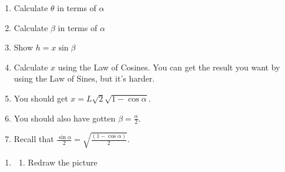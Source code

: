 \documentclass[english]{book}
\begin{document}
    \begin{enumerate}
      \item[\hspace{2cm}b)] Calculate $\theta$ in terms of $\alpha$
      \item[\hspace{2cm}c)] Calculate $\beta$ in terms of $\alpha$
      \item[\hspace{2cm}d)] Show $h = x \sin \beta$
      \item[\hspace{2cm}e)] Calculate $x$ using the Law of Cosines. You can get the result you want by using the Law of Sines, but it's harder.
      \item[\hspace{2cm}f)] You should get $x = L \sqrt{2} \sqrt{ 1 - \cos \alpha }$.
      \item[\hspace{2cm}g)] You should also have gotten $\beta = \frac{\alpha}{2}$.
      \item[\hspace{2cm}h)] Recall that $\frac{\sin \alpha}{2} = \sqrt{ \frac{(1 - \cos \alpha)}{2} }$.
    \end{enumerate}

\begin{enumerate}
  \item[\hspace{1cm}50)] \begin{enumerate}[\hspace{1cm}a)]
                           \item Redraw the picture
                         \end{enumerate}
\end{enumerate}
\end{document}
